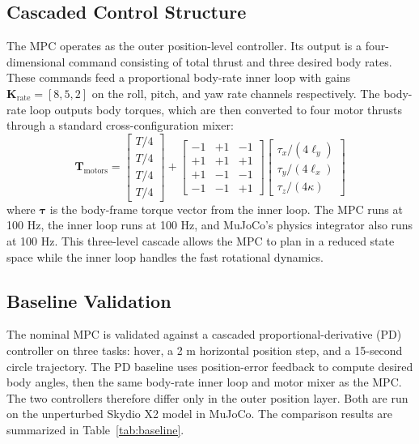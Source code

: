 \documentclass[conference]{IEEEtran}
\begin{document}
\subsection{Cascaded Control Structure}
The MPC operates as the outer position-level controller. Its output is a four-dimensional command consisting of total thrust and three desired body rates. These commands feed a proportional body-rate inner loop with gains $\mathbf{K}_{\text{rate}} = [8, 5, 2]$ on the roll, pitch, and yaw rate channels respectively. The body-rate loop outputs body torques, which are then converted to four motor thrusts through a standard cross-configuration mixer:
\begin{equation}
\mathbf{T}_{\text{motors}} = \begin{bmatrix} T/4 \\ T/4 \\ T/4 \\ T/4 \end{bmatrix} + \begin{bmatrix} -1 & +1 & -1 \\ +1 & +1 & +1 \\ +1 & -1 & -1 \\ -1 & -1 & +1 \end{bmatrix} \begin{bmatrix} \tau_x/(4\ell_y) \\ \tau_y/(4\ell_x) \\ \tau_z/(4\kappa) \end{bmatrix}
\end{equation}
where $\boldsymbol{\tau}$ is the body-frame torque vector from the inner loop. The MPC runs at 100 Hz, the inner loop runs at 100 Hz, and MuJoCo's physics integrator also runs at 100 Hz. This three-level cascade allows the MPC to plan in a reduced state space while the inner loop handles the fast rotational dynamics.

\subsection{Baseline Validation}
The nominal MPC is validated against a cascaded proportional-derivative (PD) controller on three tasks: hover, a 2 m horizontal position step, and a 15-second circle trajectory. The PD baseline uses position-error feedback to compute desired body angles, then the same body-rate inner loop and motor mixer as the MPC. The two controllers therefore differ only in the outer position layer. Both are run on the unperturbed Skydio X2 model in MuJoCo. The comparison results are summarized in Table~\ref{tab:baseline}.
\end{document}
